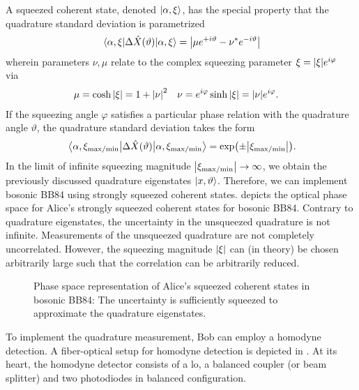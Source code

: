 A squeezed coherent state, denoted $\ket{\alpha,\xi}$, has the special property that the quadrature standard deviation is parametrized~\cite[p.~95]{Vogel2006}
\begin{equation}
	\expval{\Delta\hat{X}(\vartheta)}{\alpha,\xi}
	=
	\abs{\mu e^{+i\vartheta}-\nu^* e^{-i\vartheta}}
	\label{eq:squeezed_quadrature_std}
\end{equation}
wherein parameters $\nu,\mu$ relate to the complex squeezing parameter $\xi=\abs{\xi}e^{i\varphi}$ via~\cite[p.~90]{Vogel2006}
\begin{align}
	\mu
	&=
	\cosh\abs{\xi}
	=
	1+\abs{\nu}^2
	&
	\nu
	&=
	e^{i\varphi}
	\sinh\abs{\xi}
	=
	\abs{\nu}
	e^{i\varphi}
	\label{eq:squeezing_parameters}
	.
\end{align}
If the squeezing angle $\varphi$ satisfies a particular phase relation with the quadrature angle $\vartheta$, the quadrature standard deviation takes the form~\cite[p.~96]{Vogel2006}
\begin{equation}
	\expval{\Delta\hat{X}(\vartheta)}{\alpha,\xi_{\text{max}/\text{min}}}
	=
	\exp(\pm\abs{\xi_{\text{max}/\text{min}}})
	.
\end{equation}
In the limit of infinite squeezing magnitude $\abs{\xi_{\text{max}/\text{min}}}\to\infty$, we obtain the previously discussed quadrature eigenstates $\ket{x,\vartheta}$.
Therefore, we can implement bosonic BB84 using strongly squeezed coherent states.
 depicts the optical phase space for Alice's strongly squeezed coherent states for bosonic BB84.
Contrary to quadrature eigenstates, the uncertainty in the unsqueezed quadrature is not infinite.
Measurements of the unsqueezed quadrature are not completely uncorrelated.
However, the squeezing magnitude $\abs{\xi}$ can (in theory) be chosen arbitrarily large such that the correlation can be arbitrarily reduced.
\begin{figure}[htb]
	\centering
	
	\caption{Phase space representation of Alice's squeezed coherent states in bosonic BB84: The uncertainty is sufficiently squeezed to approximate the quadrature eigenstates.}\label{fig:phase_space_squeezed}
\end{figure}
To implement the quadrature measurement, Bob can employ a homodyne detection.
A fiber-optical setup for homodyne detection is depicted in .
At its heart, the homodyne detector consists of a \gls{lo}, a balanced coupler (or beam splitter) and two photodiodes in balanced configuration.

